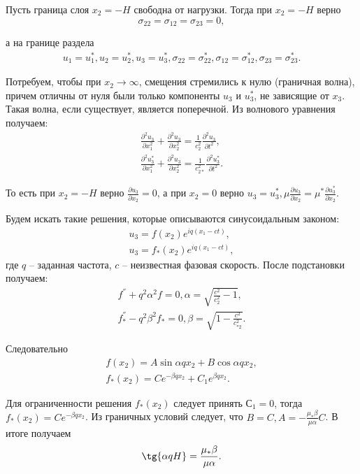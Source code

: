 Пусть граница слоя $x_2 = -H$ свободна от нагрузки. Тогда при $x_2 = -H$ верно
\begin{equation}
\sigma_{22} = \sigma_{12} = \sigma_{23} = 0,
\end{equation}

а на границе раздела
\begin{eqnarray}
u_1 = u_1^*, u_2 = u_2^*, u_3 = u_3^*,
\sigma_{22} = \sigma_{22}^*, \sigma_{12} = \sigma_{12}^*, \sigma_{23} = \sigma_{23}^*.
\end{eqnarray}

Потребуем, чтобы при $x_2 \to \infty$, смещения стремились к нулю (граничная волна), причем отличны от нуля были только компоненты $u_3$ и $u_3^*$, не зависящие от $x_3$. Такая волна, если существует, является поперечной. Из волнового уравнения получаем:
\begin{eqnarray}
\frac{\partial^2 u_3}{\partial x_1^2} + \frac{\partial^2 u_3}{\partial x_2^2} = \frac{1}{c_2^2} \frac{\partial^2 u_3}{\partial t^2}, \nonumber\\
\frac{\partial^2 u_3^*}{\partial x_1^2} + \frac{\partial^2 u_3}{\partial x_2^2} = \frac{1}{c_{2*}^2} \frac{\partial^2 u_3^*}{\partial t^2}.
\end{eqnarray}

То есть при $x_2 = -H$ верно $\frac{\partial u_3}{\partial x_2} = 0$, а при $x_2 = 0$ верно $u_3 = u_3^*, \mu\frac{\partial u_3}{\partial x_2} = \mu^*\frac{\partial u_3^*}{\partial x_2}$.

Будем искать такие решения, которые описываются синусоидальным законом:
\begin{eqnarray}
u_3 = f(x_2)e^{iq(x_1-ct)}, \nonumber\\
u_3 = f_*(x_2)e^{iq(x_1-ct)},
\end{eqnarray}
где $q$ -- заданная частота, $c$ -- неизвестная фазовая скорость. После подстановки получаем:
\begin{eqnarray}
f^{''} + q^2 \alpha^2 f = 0, \alpha = \sqrt{\frac{c^2}{c_2^2} - 1}, \nonumber\\
f_*^{''} - q^2 \beta^2 f_* = 0, \beta = \sqrt{1 - \frac{c^2}{c_{*2}^2}}.
\end{eqnarray}

Следовательно
\begin{eqnarray}
f(x_2) = A\sin{\alpha q x_2} + B\cos{\alpha q x_2}, \nonumber\\
f_*(x_2) = Ce^{-\beta q x_2} + C_1e^{\beta q x_2}.
\end{eqnarray}

Для ограниченности решения $f_*(x_2)$ следует принять $С_1 = 0$, тогда $f_*(x_2) = Ce^{-\beta q x_2}$. Из граничных условий следует, что $B = C, A = - \frac{\mu_* \beta}{\mu \alpha}C$. В итоге получаем
\begin{eqnarray}
\tg{\alpha qH} = \frac{\mu_* \beta}{\mu \alpha}.
\end{eqnarray}


